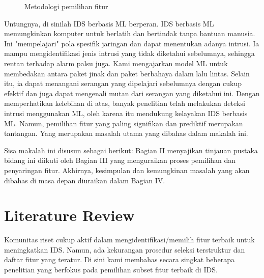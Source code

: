 \documentclass[conference]{IEEEtran}
\begin{document}
\begin{figure*}
    \begin{center}
    
    \caption{Metodologi pemilihan fitur}
    \label{fig1}
    \end{center}
\end{figure*}

Untungnya, di sinilah IDS berbasis ML berperan. IDS berbasis ML memungkinkan komputer untuk berlatih dan bertindak tanpa bantuan manusia. Ini "mempelajari" pola spesifik jaringan dan dapat menentukan adanya intrusi. Ia mampu mengidentifikasi jenis intrusi yang tidak diketahui sebelumnya, sehingga rentan terhadap alarm palsu juga. Kami mengajarkan model ML untuk membedakan antara paket jinak dan paket berbahaya dalam lalu lintas. Selain itu, ia dapat menangani serangan yang dipelajari sebelumnya dengan cukup efektif dan juga dapat mengenali mutan dari serangan yang diketahui ini. Dengan memperhatikan kelebihan di atas, banyak penelitian telah melakukan deteksi intrusi menggunakan ML, oleh karena itu mendukung kelayakan IDS berbasis ML. Namun, pemilihan fitur yang paling signifikan dan prediktif merupakan tantangan. Yang merupakan masalah utama yang dibahas dalam makalah ini.

Sisa makalah ini disusun sebagai berikut: Bagian II menyajikan tinjauan pustaka bidang ini diikuti oleh Bagian III yang menguraikan proses pemilihan dan penyaringan fitur. Akhirnya, kesimpulan dan kemungkinan masalah yang akan dibahas di masa depan diuraikan dalam Bagian IV.

\section{Literature Review}

Komunitas riset cukup aktif dalam mengidentifikasi/memilih fitur terbaik untuk meningkatkan IDS. Namun, ada kekurangan prosedur seleksi terstruktur dan daftar fitur yang teratur. Di sini kami membahas secara singkat beberapa penelitian yang berfokus pada pemilihan subset fitur terbaik di IDS.
\end{document}
